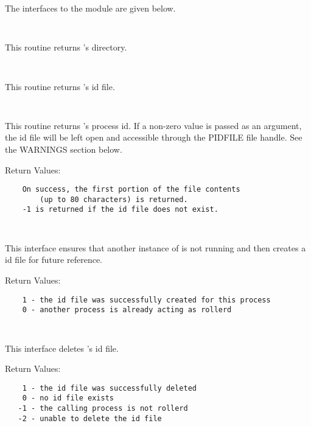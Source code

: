 The interfaces to the  module are given
below.

\begin{description}

\item {}\verb" "

This routine returns 's directory.

\item {}\verb" "

This routine returns 's id file.

\item {}\verb" "

This routine returns 's process id.  If a non-zero value
is passed as an argument, the id file will be left open and accessible through
the PIDFILE file handle.  See the WARNINGS section below.

Return Values:

\begin{verbatim}
    On success, the first portion of the file contents
        (up to 80 characters) is returned.
    -1 is returned if the id file does not exist.
\end{verbatim}

\item {}\verb" "

This interface ensures that another instance of  is not
running and then creates a id file for future reference.

Return Values:

\begin{verbatim}
    1 - the id file was successfully created for this process
    0 - another process is already acting as rollerd
\end{verbatim}

\item {}\verb" "

This interface deletes 's id file.

Return Values:

\begin{verbatim}
    1 - the id file was successfully deleted
    0 - no id file exists
   -1 - the calling process is not rollerd
   -2 - unable to delete the id file
\end{verbatim}

\item {}\verb" "


\end{description}
